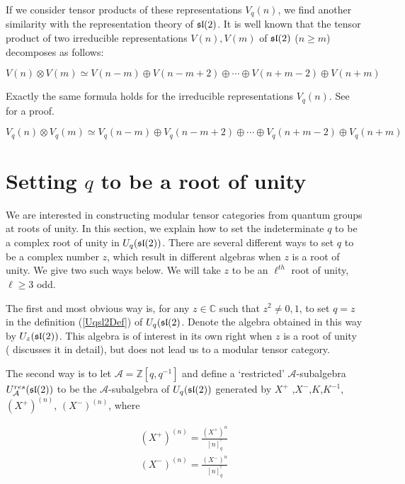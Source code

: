 If we consider tensor products of these representations $V_q(n)$, we find
another similarity with the representation theory of $\mathfrak{sl}(2)$. It is well
known that the tensor product of two irreducible representations $V(n), V(m)$
of $\mathfrak{sl}(2)$ ($n \geq m$) decomposes as follows:

\begin{equation}
V(n) \otimes V(m) \simeq V(n-m) \oplus V(n-m+2)  \oplus \cdots \oplus V(n+m-2)\oplus V(n+m)
\end{equation}

Exactly the same formula holds for the irreducible representations $V_q(n)$.
See \cite{Kassel1994} for a proof.

\begin{equation}
V_q(n) \otimes V_q(m) \simeq V_q(n-m) \oplus V_q(n-m+2)  \oplus \cdots \oplus V_q(n+m-2)\oplus V_q(n+m)
\end{equation}

\section{Setting $q$ to be a root of unity}

We are interested in constructing modular tensor categories from quantum groups
at roots of unity. In this section, we explain how to set the indeterminate $q$
to be a complex root of unity in $U_q(\mathfrak{sl}(2))$. There are several different ways to
set $q$ to be a complex number $z$, which result in different algebras when $z$
is a root of unity. We give two such ways below. We will take $z$ to be an
$\ell^{th}$ root of unity, $\ell \geq 3$ odd.

The first and most obvious way is, for any $z \in \mathbb{C}$ such that $z ^2
\neq 0,1$, to set $q = z$ in the definition (\ref{Uqsl2Def}) of $U_q(\mathfrak{sl}(2)$.
Denote the algebra obtained in this way by $U_z(\mathfrak{sl}(2))$. This algebra is of
interest in its own right when $z$ is a root of unity (\cite{Jantzen1995}
discusses it in detail), but does not lead us to a modular tensor category.

The second way is to let $\mathcal{A} = \mathbb{Z}[q,q^{-1}]$ and define a
`restricted' $\mathcal{A}$-subalgebra $U_\mathcal{A}^{res}(\mathfrak{sl}(2))$ to be the
$\mathcal{A}$-subalgebra of $U_q(\mathfrak{sl}(2))$ generated by $ X^+$
,$X^-$,$K$,$K^{-1}$, $(X^+) ^{(n)}$, $(X^-)^{(n)}$, where


\begin{align}
     (X^+)^{(n)} = \frac{ (X^+)^n}{[n]^!_{q}} \\
    (X^-)^{(n)} = \frac{(X^-)^n}{[n]^!_{q}} 
\end{align}


